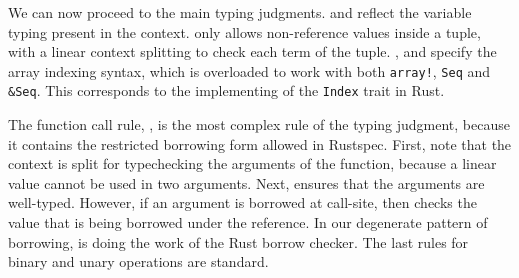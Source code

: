 \documentclass[11pt,a4paper]{article}
\newcommand{\rustspec}{\textsf{Rustspec}}
\newcommand{\syntext}[1]{\texttt{#1}}
\newcommand{\synkeyword}[1]{\textcolor{red!60!black}{\syntext{#1}}}
\newcommand{\synpunct}[1]{\textcolor{black!40!white}{\texttt{#1}}}
\newcommand{\synseq}{\syntext{Seq}}
\newcommand{\synarraymacro}{\synkeyword{array!}}
\newcommand{\synref}{\synpunct{\&}}
\begin{document}
We can now proceed to the main typing judgments.
 and  reflect the variable typing present in the context.
 only allows non-reference values inside a tuple, with a linear context
splitting to check each term of the tuple. ,  and
 specify the array indexing syntax, which is overloaded to work with
both \synarraymacro{}, \synseq{} and \synref\synseq{}. This corresponds to the implementing of
the \syntext{Index} trait in Rust.

The function call rule, , is the most complex rule of the typing judgment,
because it contains the
restricted borrowing form allowed in \rustspec{}. First, note that the context is split for
typechecking the arguments of the function, because a linear value cannot be used in two arguments.
Next,  ensures that the arguments are well-typed. However, if an argument
is borrowed at call-site, then  checks the value that is being borrowed
under the reference. In our degenerate pattern of borrowing,  is doing the
work of the Rust borrow checker. The last rules for binary and unary operations are standard.
\end{document}
